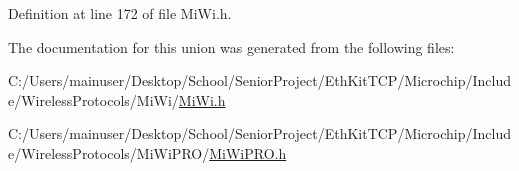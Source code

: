 Definition at line 172 of file Mi\+Wi.\+h.



The documentation for this union was generated from the following files\+:\begin{DoxyCompactItemize}
\item 
C\+:/\+Users/mainuser/\+Desktop/\+School/\+Senior\+Project/\+Eth\+Kit\+T\+C\+P/\+Microchip/\+Include/\+Wireless\+Protocols/\+Mi\+Wi/\hyperlink{_mi_wi_8h}{Mi\+Wi.\+h}\item 
C\+:/\+Users/mainuser/\+Desktop/\+School/\+Senior\+Project/\+Eth\+Kit\+T\+C\+P/\+Microchip/\+Include/\+Wireless\+Protocols/\+Mi\+Wi\+P\+R\+O/\hyperlink{_mi_wi_p_r_o_8h}{Mi\+Wi\+P\+R\+O.\+h}\end{DoxyCompactItemize}
